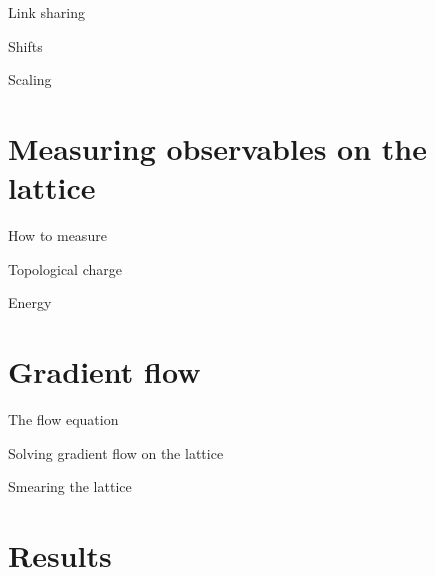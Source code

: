 \documentclass[10pt]{beamer}
\begin{document}
\begin{frame}{Link sharing}
\end{frame}

\begin{frame}{Shifts}
\end{frame}

\begin{frame}{Scaling}
\end{frame}

\section{Measuring observables on the lattice}
\begin{frame}{How to measure}
\end{frame}

\begin{frame}{Topological charge}
\end{frame}

\begin{frame}{Energy}
\end{frame}

\section{Gradient flow}

\begin{frame}{The flow equation}
\end{frame}

\begin{frame}{Solving gradient flow on the lattice}
\end{frame}

\begin{frame}{Smearing the lattice}
\end{frame}

\section{Results}
\end{document}
